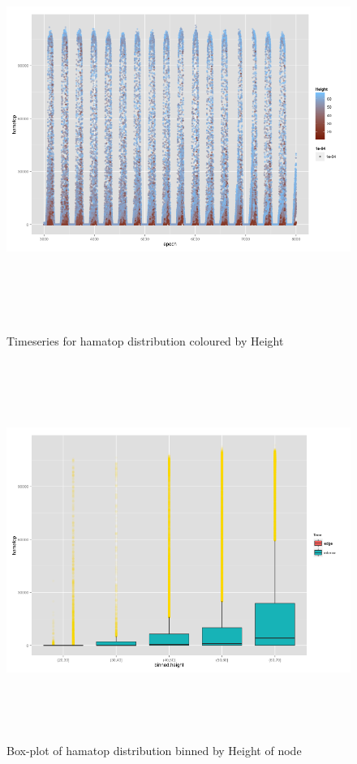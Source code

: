 \documentclass[english]{article}\usepackage[]{graphicx}\usepackage[]{color}
\begin{document}
\begin{figure}[H]

\includegraphics[width=\linewidth,height=350pt]{hamatime}
\caption{Timeseries for hamatop distribution coloured by Height}


\includegraphics[width=\linewidth,height=350pt]{boxplothama}
\caption{Box-plot of hamatop distribution binned by Height of node}

\end{figure}
\end{document}

